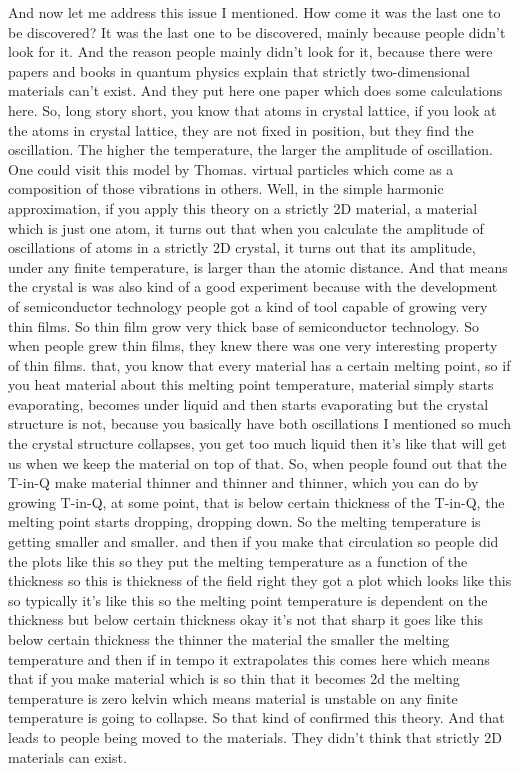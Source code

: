 And now let me address this issue I mentioned. How come it was the last one to be discovered? It was the last one to be discovered, mainly because people didn't look for it. And the reason people mainly didn't look for it, because there were papers and books in quantum physics explain that strictly two-dimensional materials can't exist. And they put here one paper which does some calculations here. So, long story short, you know that atoms in crystal lattice, if you look at the atoms in crystal lattice, they are not fixed in position, but they find the oscillation. The higher the temperature, the larger the amplitude of oscillation. One could visit this model by Thomas. virtual particles which come as a composition of those vibrations in others. Well, in the simple harmonic approximation, if you apply this theory on a strictly 2D material, a material which is just one atom, it turns out that when you calculate the amplitude of oscillations of atoms in a strictly 2D crystal, it turns out that its amplitude, under any finite temperature, is larger than the atomic distance. And that means the crystal is was also kind of a good experiment because with the development of semiconductor technology people got a kind of tool capable of growing very thin films. So thin film grow very thick base of semiconductor technology. So when people grew thin films, they knew there was one very interesting property of thin films. that, you know that every material has a certain melting point, so if you heat material about this melting point temperature, material simply starts evaporating, becomes under liquid and then starts evaporating but the crystal structure is not, because you basically have both oscillations I mentioned so much the crystal structure collapses, you get too much liquid then it's like that will get us when we keep the material on top of that. So, when people found out that the T-in-Q make material thinner and thinner and thinner, which you can do by growing T-in-Q, at some point, that is below certain thickness of the T-in-Q, the melting point starts dropping, dropping down. So the melting temperature is getting smaller and smaller. and then if you make that circulation so people did the plots like this so they put the melting temperature as a function of the thickness so this is thickness of the field right they got a plot which looks like this so typically it's like this so the melting point temperature is dependent on the thickness but below certain thickness okay it's not that sharp it goes like this below certain thickness the thinner the material the smaller the melting temperature and then if in tempo it extrapolates this comes here which means that if you make material which is so thin that it becomes 2d the melting temperature is zero kelvin which means material is unstable on any finite temperature is going to collapse. So that kind of confirmed this theory. And that leads to people being moved to the materials. They didn't think that strictly 2D materials can exist.
